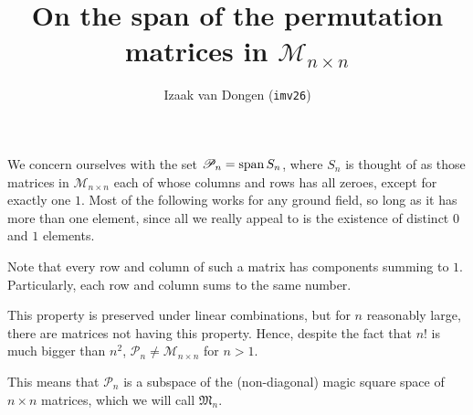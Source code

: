 \documentclass[a4paper,12pt]{article}
\author{Izaak van Dongen (\texttt{imv26})}
\title{On the span of the permutation matrices in \(\mathcal M_{n \times n}\)}
\begin{document}
\maketitle

We concern ourselves with the set \(\mathscr P_n = \operatorname{span} S_n\), where
\(S_n\) is thought of as those matrices in \(\mathcal M_{n \times n}\) each of
whose columns and rows has all zeroes, except for exactly one \(1\). Most of the
following works for any ground field, so long as it has more than one element,
since all we really appeal to is the existence of distinct \(0\) and \(1\)
elements.

Note that every row and column of such a matrix has components summing to \(1\).
Particularly, each row and column sums to the same number.

This property is preserved under linear combinations, but for \(n\) reasonably
large, there are matrices not having this property. Hence, despite the fact that
\(n!\) is much bigger than \(n^2\), \(\mathscr P_n \ne \mathcal M_{n \times n}\)
for \(n > 1\).

This means that \(\mathscr P_n\) is a subspace of the (non-diagonal) magic
square space of \(n \times n\) matrices, which we will call \(\mathfrak M_n\).
\end{document}
